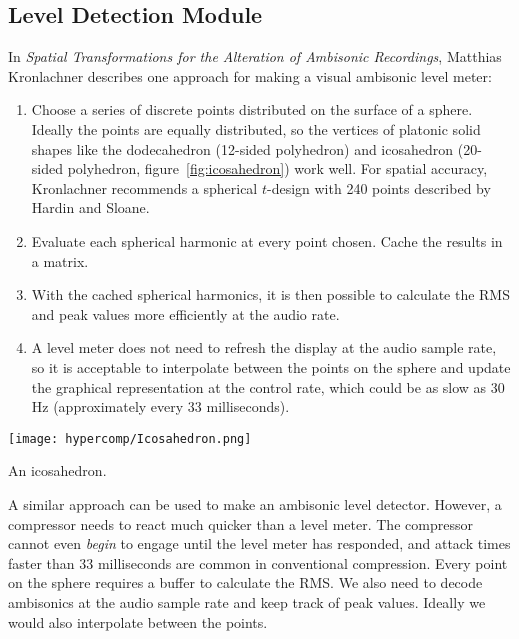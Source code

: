 \subsection{Level Detection Module}
\label{sec:an-accurate-level}
In \textit{Spatial Transformations for the Alteration of Ambisonic
  Recordings}, Matthias Kronlachner describes
one approach for making a visual ambisonic level meter:\cite{Kronlachner2014} 
\begin{enumerate}
\item Choose a series of discrete points distributed on the surface of
  a sphere. Ideally the points are equally distributed, so the
  vertices of platonic solid shapes like the dodecahedron (12-sided
  polyhedron) and icosahedron (20-sided polyhedron,
  figure~\ref{fig:icosahedron}) work well. For spatial accuracy,
  Kronlachner recommends a spherical $t$-design with 240 points
  described by Hardin and Sloane.\cite{Hardin1996}
\item Evaluate each spherical harmonic at every point chosen. Cache
  the results in a matrix. 
\item With the cached spherical harmonics, it is then possible to
  calculate the RMS and peak values more efficiently at the audio
  rate.
\item A level meter does not need to refresh the display at the audio
  sample rate, so it is acceptable to interpolate between the points
  on the sphere and update the graphical representation at the
  control rate, which could be as slow as 30 Hz (approximately every
  33 milliseconds).
\end{enumerate}
\begin{marginfigure}
  \texttt{[image: hypercomp/Icosahedron.png]}
  \caption{An icosahedron.}
  \label{fig:icosahedron}
\end{marginfigure}
A similar approach can be used to make an ambisonic level
detector. However, a compressor needs to react much quicker than a
level meter. The compressor cannot even \emph{begin} to engage until
the level meter has responded, and attack times faster than 33
milliseconds are common in conventional compression. Every point on
the sphere requires a buffer to calculate the RMS. We also need to
decode ambisonics at the audio sample rate and keep track of peak
values. Ideally we would also interpolate between the points.

